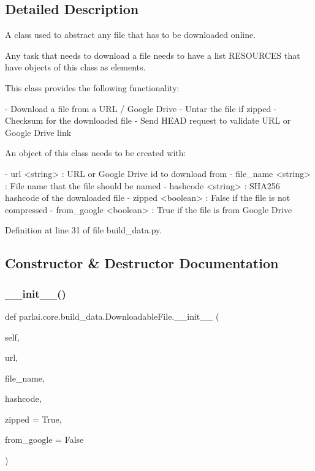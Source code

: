 \subsection{Detailed Description}
\begin{DoxyVerb}A class used to abstract any file that has to be downloaded online.

Any task that needs to download a file needs to have a list RESOURCES
that have objects of this class as elements.

This class provides the following functionality:

- Download a file from a URL / Google Drive
- Untar the file if zipped
- Checksum for the downloaded file
- Send HEAD request to validate URL or Google Drive link

An object of this class needs to be created with:

- url <string> : URL or Google Drive id to download from
- file_name <string> : File name that the file should be named
- hashcode <string> : SHA256 hashcode of the downloaded file
- zipped <boolean> : False if the file is not compressed
- from_google <boolean> : True if the file is from Google Drive
\end{DoxyVerb}
 

Definition at line 31 of file build\+\_\+data.\+py.



\subsection{Constructor \& Destructor Documentation}
\mbox{\label{classparlai_1_1core_1_1build__data_1_1DownloadableFile_a674bba356b2fba56bb013b773233f2a7}} 
\subsubsection{\texorpdfstring{\+\_\+\+\_\+init\+\_\+\+\_\+()}{\_\_init\_\_()}}
{\footnotesize\ttfamily def parlai.\+core.\+build\+\_\+data.\+Downloadable\+File.\+\_\+\+\_\+init\+\_\+\+\_\+ (\begin{DoxyParamCaption}\item[{}]{self,  }\item[{}]{url,  }\item[{}]{file\+\_\+name,  }\item[{}]{hashcode,  }\item[{}]{zipped = {\ttfamily True},  }\item[{}]{from\+\_\+google = {\ttfamily False} }\end{DoxyParamCaption})}



